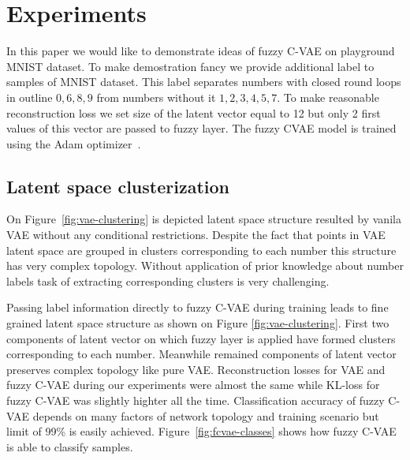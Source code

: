 \documentclass[runningheads]{llncs}
\begin{document}
\section{Experiments}

In this paper we would like to demonstrate ideas of fuzzy C-VAE on playground MNIST dataset.
To make demostration fancy we provide additional label to samples of MNIST dataset.
This label separates numbers with closed round loops in outline $0,6,8,9$ from numbers without it $1,2,3,4,5,7$.
To make reasonable reconstruction loss we set size of the latent vector equal to 12 but only 2 first values of this vector are passed to fuzzy layer.
The fuzzy CVAE model is trained using the Adam optimizer~\cite{kingma2017adam}.

\subsection{Latent space clusterization}

On Figure~\ref{fig:vae-clustering} is depicted latent space structure resulted by vanila VAE without any conditional restrictions.
Despite the fact that points in VAE latent space are grouped in clusters corresponding to each number this structure has very complex topology.
Without application of prior knowledge about number labels task of extracting corresponding clusters is very challenging.

Passing label information directly to fuzzy C-VAE during training leads to fine grained latent space structure as shown on Figure \ref{fig:vae-clustering}.
First two components of latent vector on which fuzzy layer is applied have formed clusters corresponding to each number.
Meanwhile remained components of latent vector preserves complex topology like pure VAE.
Reconstruction losses for VAE and fuzzy C-VAE during our experiments were almost the same while KL-loss for fuzzy C-VAE was slightly highter all the time.
Classification accuracy of fuzzy C-VAE depends on many factors of network topology and training scenario but limit of 99\% is easily achieved.
Figure~\ref{fig:fcvae-classes} shows how fuzzy C-VAE is able to classify samples.
\end{document}
